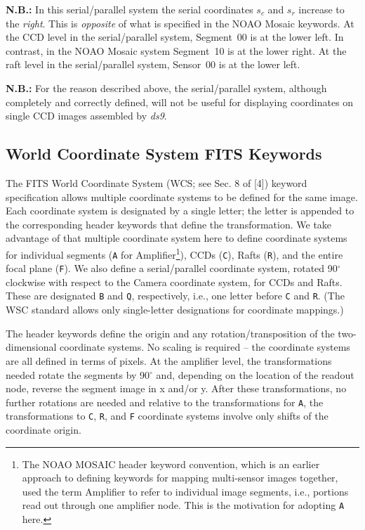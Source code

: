 \documentclass{article}[12pt]
\begin{document}
{\bf N.B.:} In this serial/parallel system the serial coordinates $s_c$ and $s_r$ increase to the {\it right}.  This is {\it opposite} of what is specified in the NOAO Mosaic keywords.  At the CCD level in the serial/parallel system, Segment~00 is at the lower left.  In contrast, in the NOAO Mosaic system Segment~10 is at the lower right.  At the raft level in the serial/parallel system, Sensor~00 is at the lower left.

{\bf N.B.:} For the reason described above, the serial/parallel system, although completely and correctly defined, will not be useful for displaying coordinates on single CCD images assembled by {\it ds9}.

\subsection{World Coordinate System FITS Keywords}
The FITS World Coordinate System (WCS; see Sec. 8 of [4]) keyword specification allows multiple coordinate systems to be defined for the same image.  Each coordinate system is designated by a single letter; the letter is appended to the corresponding header keywords that define the transformation.  We take advantage of that multiple coordinate system here to define coordinate systems for individual segments ({\tt A} for Amplifier\footnote{The NOAO MOSAIC header keyword convention, which is an earlier approach to defining keywords for mapping multi-sensor images together, used the term Amplifier to refer to individual image segments, i.e., portions read out through one amplifier node.  This is the motivation for adopting {\tt A} here.}), CCDs ({\tt C}), Rafts ({\tt R}), and the entire focal plane ({\tt F}). We also define a serial/parallel coordinate system, rotated 90$^\circ$ clockwise with respect to the Camera coordinate system, for CCDs and Rafts.  These are designated {\tt B} and {\tt Q}, respectively, i.e., one letter before {\tt C} and {\tt R}.  (The WSC standard allows only single-letter designations for coordinate mappings.)

The header keywords define the origin and any rotation/transposition of the two-dimensional coordinate systems.   No scaling is required -- the coordinate systems are all defined in terms of pixels.  At the amplifier level, the transformations needed rotate the segments by 90$^\circ$ and, depending on the location of the readout node, reverse the segment image in x and/or y.  After these transformations, no further rotations are needed and relative to the transformations for {\tt A}, the transformations to {\tt C}, {\tt R}, and {\tt F} coordinate systems involve only shifts of the coordinate origin.
\end{document}
